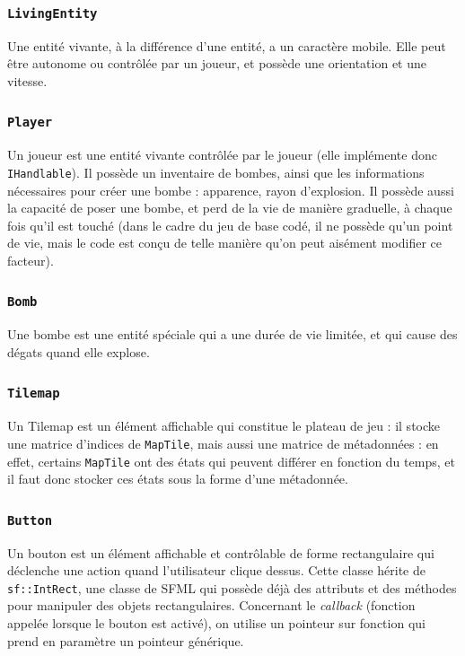 \documentclass[a4paper,10pt]{report}
\begin{document}
\subsubsection{\texttt{LivingEntity}}

Une entité vivante, à la différence d'une entité, a un caractère mobile. Elle peut être autonome ou contrôlée par un joueur, et possède une orientation et une vitesse.
\subsubsection{\texttt{Player}}

Un joueur est une entité vivante contrôlée par le joueur (elle implémente donc \texttt{IHandlable}). Il possède un inventaire de bombes, ainsi que les informations nécessaires pour créer une bombe : apparence, rayon d'explosion. Il possède aussi la capacité de poser une bombe, et perd de la vie de manière graduelle, à chaque fois qu'il est touché (dans le cadre du jeu de base codé, il ne possède qu'un point de vie, mais le code est conçu de telle manière qu'on peut aisément modifier ce facteur).
\subsubsection{\texttt{Bomb}}

Une bombe est une entité spéciale qui a une durée de vie limitée, et qui cause des dégats quand elle explose.
\subsubsection{\texttt{Tilemap}}

Un Tilemap est un élément affichable qui constitue le plateau de jeu : il stocke une matrice d'indices de \texttt{MapTile}, mais aussi une matrice de métadonnées : en effet, certains \texttt{MapTile} ont des états qui peuvent différer en fonction du temps, et il faut donc stocker ces états sous la forme d'une métadonnée.
\subsubsection{\texttt{Button}}

Un bouton est un élément affichable et contrôlable de forme rectangulaire qui déclenche une action quand l'utilisateur clique dessus. Cette classe hérite de \texttt{sf::IntRect}, une classe de SFML qui possède déjà des attributs et des méthodes pour manipuler des objets rectangulaires. Concernant le \textit{callback} (fonction appelée lorsque le bouton est activé), on utilise un pointeur sur fonction qui prend en paramètre un pointeur générique.
\end{document}
